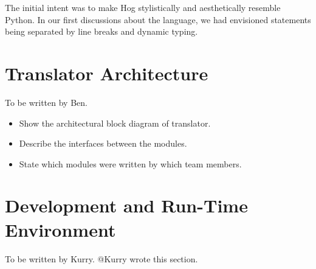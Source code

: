 \documentclass{book}
\begin{document}
The initial intent was to make Hog stylistically and aesthetically resemble Python. In our first discussions about the language, we had envisioned statements being separated by line breaks and dynamic typing.

\chapter{Translator Architecture}
\label{chap:trans}

To be written by Ben.

\begin{itemize}
\item Show the architectural block diagram of translator.
\item Describe the interfaces between the modules.
\item State which modules were written by which team members.
\end{itemize}

\chapter{Development and Run-Time Environment}
\label{chap:environ}

To be written by Kurry.
@Kurry wrote this section. 
\end{document}
